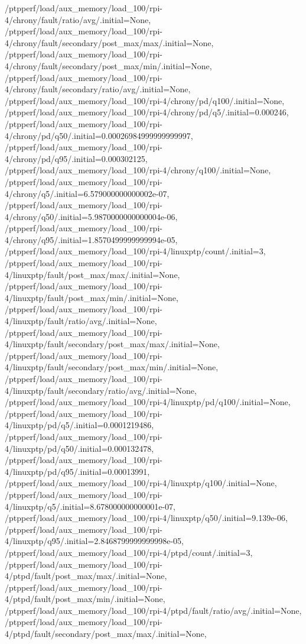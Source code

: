 {    /ptpperf/load/aux_memory/load_100/rpi-4/chrony/fault/ratio/avg/.initial=None,
    /ptpperf/load/aux_memory/load_100/rpi-4/chrony/fault/secondary/post_max/max/.initial=None,
    /ptpperf/load/aux_memory/load_100/rpi-4/chrony/fault/secondary/post_max/min/.initial=None,
    /ptpperf/load/aux_memory/load_100/rpi-4/chrony/fault/secondary/ratio/avg/.initial=None,
    /ptpperf/load/aux_memory/load_100/rpi-4/chrony/pd/q100/.initial=None,
    /ptpperf/load/aux_memory/load_100/rpi-4/chrony/pd/q5/.initial=0.000246,
    /ptpperf/load/aux_memory/load_100/rpi-4/chrony/pd/q50/.initial=0.00026984999999999997,
    /ptpperf/load/aux_memory/load_100/rpi-4/chrony/pd/q95/.initial=0.000302125,
    /ptpperf/load/aux_memory/load_100/rpi-4/chrony/q100/.initial=None,
    /ptpperf/load/aux_memory/load_100/rpi-4/chrony/q5/.initial=6.579000000000002e-07,
    /ptpperf/load/aux_memory/load_100/rpi-4/chrony/q50/.initial=5.9870000000000004e-06,
    /ptpperf/load/aux_memory/load_100/rpi-4/chrony/q95/.initial=1.8570499999999994e-05,
    /ptpperf/load/aux_memory/load_100/rpi-4/linuxptp/count/.initial=3,
    /ptpperf/load/aux_memory/load_100/rpi-4/linuxptp/fault/post_max/max/.initial=None,
    /ptpperf/load/aux_memory/load_100/rpi-4/linuxptp/fault/post_max/min/.initial=None,
    /ptpperf/load/aux_memory/load_100/rpi-4/linuxptp/fault/ratio/avg/.initial=None,
    /ptpperf/load/aux_memory/load_100/rpi-4/linuxptp/fault/secondary/post_max/max/.initial=None,
    /ptpperf/load/aux_memory/load_100/rpi-4/linuxptp/fault/secondary/post_max/min/.initial=None,
    /ptpperf/load/aux_memory/load_100/rpi-4/linuxptp/fault/secondary/ratio/avg/.initial=None,
    /ptpperf/load/aux_memory/load_100/rpi-4/linuxptp/pd/q100/.initial=None,
    /ptpperf/load/aux_memory/load_100/rpi-4/linuxptp/pd/q5/.initial=0.0001219486,
    /ptpperf/load/aux_memory/load_100/rpi-4/linuxptp/pd/q50/.initial=0.000132478,
    /ptpperf/load/aux_memory/load_100/rpi-4/linuxptp/pd/q95/.initial=0.00013991,
    /ptpperf/load/aux_memory/load_100/rpi-4/linuxptp/q100/.initial=None,
    /ptpperf/load/aux_memory/load_100/rpi-4/linuxptp/q5/.initial=8.678000000000001e-07,
    /ptpperf/load/aux_memory/load_100/rpi-4/linuxptp/q50/.initial=9.139e-06,
    /ptpperf/load/aux_memory/load_100/rpi-4/linuxptp/q95/.initial=2.8468799999999998e-05,
    /ptpperf/load/aux_memory/load_100/rpi-4/ptpd/count/.initial=3,
    /ptpperf/load/aux_memory/load_100/rpi-4/ptpd/fault/post_max/max/.initial=None,
    /ptpperf/load/aux_memory/load_100/rpi-4/ptpd/fault/post_max/min/.initial=None,
    /ptpperf/load/aux_memory/load_100/rpi-4/ptpd/fault/ratio/avg/.initial=None,
    /ptpperf/load/aux_memory/load_100/rpi-4/ptpd/fault/secondary/post_max/max/.initial=None,
}
